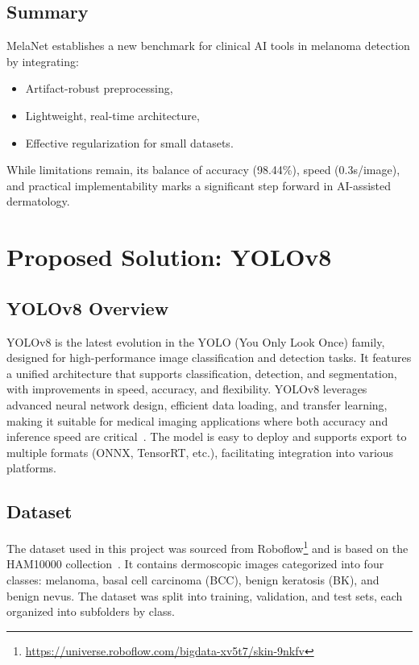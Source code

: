 \documentclass[a4paper,12pt]{report}
\begin{document}
\begin{spacing}{1.5}
    \section{Summary}
    
    MelaNet establishes a new benchmark for clinical AI tools in melanoma detection by integrating:
    \begin{itemize}
        \item Artifact-robust preprocessing,
        \item Lightweight, real-time architecture,
        \item Effective regularization for small datasets.
    \end{itemize}
    While limitations remain, its balance of accuracy (98.44\%), speed (0.3s/image), and practical implementability marks a significant step forward in AI-assisted dermatology.

\newpage

\chapter{Proposed Solution: YOLOv8}
    
    \section{YOLOv8 Overview}
    YOLOv8 is the latest evolution in the YOLO (You Only Look Once) family, designed for high-performance image classification and detection tasks. It features a unified architecture that supports classification, detection, and segmentation, with improvements in speed, accuracy, and flexibility. YOLOv8 leverages advanced neural network design, efficient data loading, and transfer learning, making it suitable for medical imaging applications where both accuracy and inference speed are critical~\cite{ultralytics23}. The model is easy to deploy and supports export to multiple formats (ONNX, TensorRT, etc.), facilitating integration into various platforms.
    
    \section{Dataset}
    The dataset used in this project was sourced from Roboflow\footnote{\url{https://universe.roboflow.com/bigdata-xv5t7/skin-9nkfv}} and is based on the HAM10000 collection~\cite{intro5}. It contains dermoscopic images categorized into four classes: melanoma, basal cell carcinoma (BCC), benign keratosis (BK), and benign nevus. The dataset was split into training, validation, and test sets, each organized into subfolders by class.
    

\end{spacing}
\end{document}

